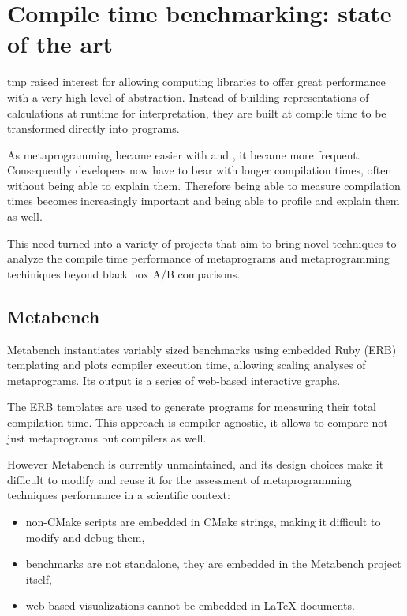 \documentclass[../main]{subfiles}
\begin{document}
\section{
  Compile time benchmarking: state of the art
}

\cpp \acrfull{tmp} raised interest for allowing computing libraries
to offer great performance with a very high level of abstraction.
Instead of building representations of calculations at runtime for
interpretation, they are built at compile time to be transformed directly into
programs.

As metaprogramming became easier with  and ,
it became more frequent. Consequently developers now have to bear with longer
compilation times, often without being able to explain them.
Therefore being able to measure compilation times becomes increasingly important
and being able to profile and explain them as well.

This need turned into a variety of projects that aim to bring novel techniques
to analyze the compile time performance of \cpp metaprograms and metaprogramming
techiniques beyond black box A/B comparisons.

%

\subsection{
  Metabench
}

Metabench\cite{metabench} instantiates variably sized benchmarks using
embedded Ruby (ERB) templating and plots compiler execution time, allowing
scaling analyses of metaprograms. Its output is a series of web-based
interactive graphs.

The ERB templates are used to generate \cpp programs for measuring their
total compilation time. This approach is compiler-agnostic, it allows to compare
not just metaprograms but compilers as well.

However Metabench is currently unmaintained, and its design choices make it
difficult to modify and reuse it for the assessment of metaprogramming
techniques performance in a scientific context:

\begin{itemize}
\item
non-CMake scripts are embedded in CMake strings, making it difficult to modify
and debug them,

\item
benchmarks are not standalone, they are embedded in the Metabench
project itself,

\item
web-based visualizations cannot be embedded in \LaTeX{} documents.
\end{itemize}
\end{document}
